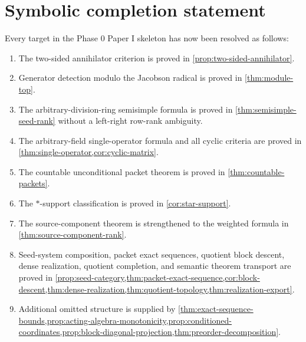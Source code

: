 \documentclass[11pt]{article}
\theoremstyle{definition}
\theoremstyle{remark}
\begin{document}
\section{Symbolic completion statement}

Every target in the Phase 0 Paper I skeleton has now been resolved as follows:
\begin{enumerate}[label=\textbf{I.\arabic*.},leftmargin=*,itemsep=0.3em,topsep=0.4em]
\item The two-sided annihilator criterion is proved in \cref{prop:two-sided-annihilator}.
\item Generator detection modulo the Jacobson radical is proved in \cref{thm:module-top}.
\item The arbitrary-division-ring semisimple formula is proved in \cref{thm:semisimple-seed-rank} without a left-right row-rank ambiguity.
\item The arbitrary-field single-operator formula and all cyclic criteria are proved in \cref{thm:single-operator,cor:cyclic-matrix}.
\item The countable unconditional packet theorem is proved in \cref{thm:countable-packets}.
\item The $*$-support classification is proved in \cref{cor:star-support}.
\item The source-component theorem is strengthened to the weighted formula in \cref{thm:source-component-rank}.
\item Seed-system composition, packet exact sequences, quotient block descent, dense realization, quotient completion, and semantic theorem transport are proved in \cref{prop:seed-category,thm:packet-exact-sequence,cor:block-descent,thm:dense-realization,thm:quotient-topology,thm:realization-export}.
\item Additional omitted structure is supplied by \cref{thm:exact-sequence-bounds,prop:acting-algebra-monotonicity,prop:conditioned-coordinates,prop:block-diagonal-projection,thm:preorder-decomposition}.
\end{enumerate}
\end{document}
